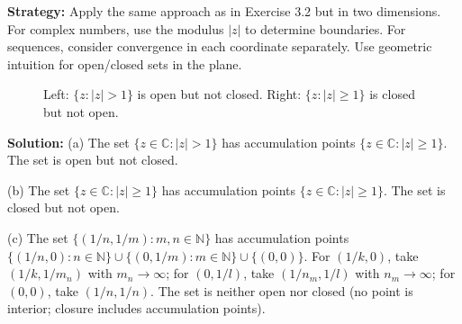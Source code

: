 \noindent\textbf{Strategy:} Apply the same approach as in Exercise 3.2 but in two dimensions. For complex numbers, use the modulus $|z|$ to determine boundaries. For sequences, consider convergence in each coordinate separately. Use geometric intuition for open/closed sets in the plane.

\begin{figure}[h]
\centering
{}
\caption{Left: $\{z : |z| > 1\}$ is open but not closed. Right: $\{z : |z| \geq 1\}$ is closed but not open.}
\end{figure}

\bigskip\noindent\textbf{Solution:}
(a) The set $\{z \in \mathbb{C} : |z| > 1\}$ has accumulation points $\{z \in \mathbb{C} : |z| \geq 1\}$. The set is open but not closed.

(b) The set $\{z \in \mathbb{C} : |z| \geq 1\}$ has accumulation points $\{z \in \mathbb{C} : |z| \geq 1\}$. The set is closed but not open.

(c) The set $\{(1/n, 1/m) : m,n \in \mathbb{N}\}$ has accumulation points $\{(1/n, 0) : n \in \mathbb{N}\} \cup \{(0, 1/m) : m \in \mathbb{N}\} \cup \{(0, 0)\}$. For $(1/k, 0)$, take $(1/k, 1/m_n)$ with $m_n \to \infty$; for $(0, 1/l)$, take $(1/n_m, 1/l)$ with $n_m \to \infty$; for $(0, 0)$, take $(1/n, 1/n)$. The set is neither open nor closed (no point is interior; closure includes accumulation points).

